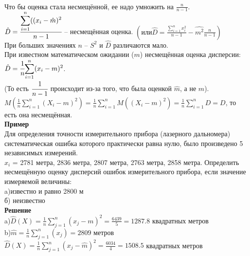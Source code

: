 \documentclass[russian, 12pt, fleqn,x11names]{article}
\begin{document}
\\
Что бы оценка стала несмещённой, ее надо умножить на $\frac{n}{n - 1}$.\\
$\hat{D} = \cfrac{\displaystyle{\sum \limits _{i = 1}^{n}( (x_i - \hat{m})^2 }}{n - 1}$ -- несмещённая оценка. $ \displaystyle{\left ( или \hat{D} = \frac{\sum \limits _{i = 1}^{n} x_i^2}{n - 1} - \hat{m^2} \frac{n}{n - 1}\right )}$\\
При больших значениях $n$ -- $S^2$ и $\hat{D}$ различаются мало.\\ При известном математическом ожидании ($m$) несмещённая оценка дисперсии:$\hat{D} = \cfrac{1}{n} \displaystyle{\sum \limits_{i=1}^{n}(x_i - m)^2}$.\\ (То есть $\cfrac{1}{n - 1}$ происходит из-за того, что была оценкой $\hat{m}$, а не $m$).\\
$ \displaystyle{M \left( \frac{1}{n} \sum \limits_{i = 1}^{n} (X_i - m)^2 \right) = \frac{1}{n} \displaystyle{\sum \limits_{i = 1}^{n}} M((X_i - m)^2) = \frac{1}{n} \displaystyle{\sum \limits_{i = 1}^{n}}  D = D}$,
{то есть она несмещённая.}\\
\textbf{Пример}\\
Для определения точности измерительного прибора (лазерного дальномера) систематическая ошибка которого практически равна нулю, было произведено 5 независимых измерений.\\
$x_i$  = 2781 метра, 2836 метра, 2807 метра, 2763 метра, 2858 метра. Определить несмещённую оценку дисперсий ошибок  измерительного прибора, если значение измеряемой величины:\\
a)известно и равно 2800 м\\
б) неизвестно\\
\textbf{Решение}\\
a)$\hat{D}(X) = \frac{1}{n} \displaystyle{\sum \limits_{j = 1}^{n}}(x_j - m)^2 = \frac{6439}{5} = 1287.8$ квадратных метров\\
b)$\hat{m} = \frac{1}{n} \displaystyle{\sum \limits_{j = 1}^{n}}(x_j)= 2809$  метров\\
$\hat{D}(X) = \frac{1}{n} \displaystyle{\sum \limits_{j = 1}^{n}}(x_j - \hat{m})^2 = \frac{6034}{4} = 1508.5$ квадратных метров\\
\end{document}
